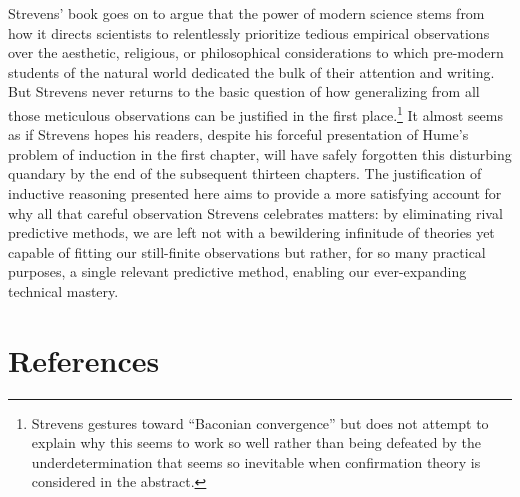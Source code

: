 \documentclass[
  letterpaper,
  DIV=11,
  numbers=noendperiod]{scrartcl}
\theoremstyle{definition}
\theoremstyle{remark}
\begin{document}
Strevens' book goes on to argue that the power of modern science stems
from how it directs scientists to relentlessly prioritize tedious
empirical observations over the aesthetic, religious, or philosophical
considerations to which pre-modern students of the natural world
dedicated the bulk of their attention and writing. But Strevens never
returns to the basic question of how generalizing from all those
meticulous observations can be justified in the first place.\footnote{Strevens
  gestures toward ``Baconian convergence'' but does not attempt to
  explain why this seems to work so well rather than being defeated by
  the underdetermination that seems so inevitable when confirmation
  theory is considered in the abstract.} It almost seems as if Strevens
hopes his readers, despite his forceful presentation of Hume's problem
of induction in the first chapter, will have safely forgotten this
disturbing quandary by the end of the subsequent thirteen chapters. The
justification of inductive reasoning presented here aims to provide a
more satisfying account for why all that careful observation Strevens
celebrates matters: by eliminating rival predictive methods, we are left
not with a bewildering infinitude of theories yet capable of fitting our
still-finite observations but rather, for so many practical purposes, a
single relevant predictive method, enabling our ever-expanding technical
mastery.

\section*{References}\label{references}
\end{document}
